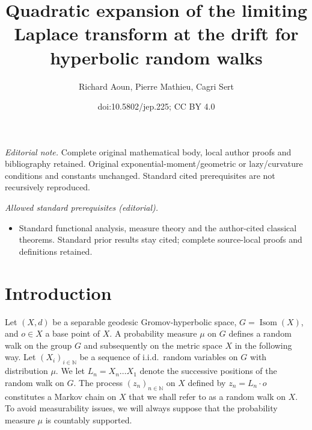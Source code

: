 \documentclass[10pt]{amsart}
\title{Quadratic expansion of the limiting Laplace transform at the drift for hyperbolic random walks}
\author{Richard Aoun, Pierre Mathieu, Cagri Sert}
\date{doi:10.5802/jep.225; CC BY 4.0}
\theoremstyle{plain}
\theoremstyle{definition}
\newcommand\N{\mathbb{N}}
\DeclareMathOperator\Isom{Isom}
\begin{document}
\maketitle
\noindent\textit{Editorial note.} Complete original mathematical body, local author proofs and bibliography retained. Original exponential-moment/geometric or lazy/curvature conditions and constants unchanged. Standard cited prerequisites are not recursively reproduced.\par\medskip
\noindent\textit{Allowed standard prerequisites (editorial).}\begin{itemize}
\item Standard functional analysis, measure theory and the author-cited classical theorems. Standard prior results stay cited; complete source-local proofs and definitions retained.
\end{itemize}\medskip

\tableofcontents


\section{Introduction}
Let $(X,d)$ be a separable geodesic Gromov-hyperbolic space,
$G=\Isom(X)$, and $o \in X$ a base point of $X$. A probability measure $\mu$ on $G$ defines a random walk on the group $G$ and subsequently on the metric space $X$ in the following way. Let $(X_i)_{i\in \N}$ be a sequence of i.i.d.~random variables on $G$ with distribution $\mu$. We let $L_n=X_n \dots X_1$ denote the successive positions of the random walk on $G$. The process $(z_n)_{n \in \N}$ on $X$ defined by $z_n=L_n \cdot o$ constitutes a Markov chain on $X$ that we shall refer to as a random walk on $X$. To avoid measurability issues, we will always suppose that the probability measure $\mu$ is countably supported.
\end{document}
